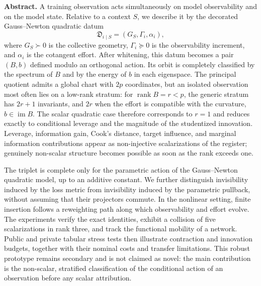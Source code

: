 \documentclass[10pt,a4paper]{article}
\newcommand{\Img}{\operatorname{im}}
\newcommand{\rank}{\operatorname{rank}}
\newcommand{\Jreg}{\mathfrak D}
\begin{document}
\begin{abstractbox}
\small
\textbf{Abstract.} A training observation acts simultaneously on model observability and on the model state. Relative to a context $S$, we describe it by the decorated Gauss--Newton quadratic datum
\[
\Jreg_{i\mid S}=(G_S,\Gamma_i,\alpha_i),
\]
where $G_S\succ0$ is the collective geometry, $\Gamma_i\succeq0$ is the observability increment, and $\alpha_i$ is the cotangent effort. After whitening, this datum becomes a pair $(B,b)$ defined modulo an orthogonal action. Its orbit is completely classified by the spectrum of $B$ and by the energy of $b$ in each eigenspace. The principal quotient admits a global chart with $2p$ coordinates, but an isolated observation most often lies on a low-rank stratum: for $\rank B=r<p$, the generic stratum has $2r+1$ invariants, and $2r$ when the effort is compatible with the curvature, $b\in\Img B$. The scalar quadratic case therefore corresponds to $r=1$ and reduces exactly to conditional leverage and the magnitude of the studentized innovation. Leverage, information gain, Cook's distance, target influence, and marginal information contributions appear as non-injective scalarizations of the register; genuinely non-scalar structure becomes possible as soon as the rank exceeds one.

The triplet is complete only for the parametric action of the Gauss--Newton quadratic model, up to an additive constant. We further distinguish invisibility induced by the loss metric from invisibility induced by the parametric pullback, without assuming that their projectors commute. In the nonlinear setting, finite insertion follows a reweighting path along which observability and effort evolve. The experiments verify the exact identities, exhibit a collision of five scalarizations in rank three, and track the functional mobility of a network. Public and private tabular stress tests then illustrate contraction and innovation budgets, together with their nominal costs and transfer limitations. This robust prototype remains secondary and is not claimed as novel: the main contribution is the non-scalar, stratified classification of the conditional action of an observation before any scalar attribution.
\end{abstractbox}

\clearpage
\hypersetup{pageanchor=true}
\setcounter{tocdepth}{1}
\tableofcontents
\clearpage

\end{document}
